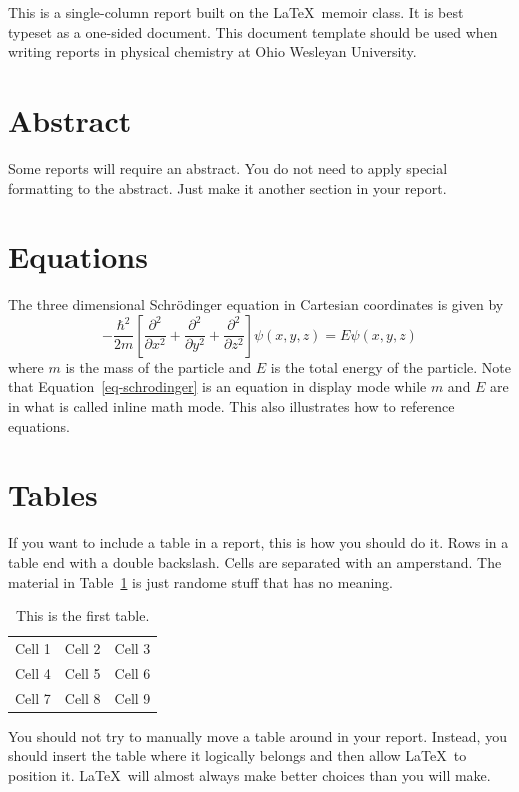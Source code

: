 \documentclass[letterpaper,article,11pt,oneside]{memoir}
\title{\doctitle}
\author{\docauthor}
\date{\docdate}
\begin{document}
\maketitle
\thispagestyle{empty}

\noindent This is a single-column report built on the \LaTeX\ memoir class. It is best typeset as a one-sided document. This document template should be used when writing reports in physical chemistry at Ohio Wesleyan University. 

\section{Abstract}
Some reports will require an abstract. You do not need to apply special formatting to the abstract. Just make it another section in your report. 

\section{Equations}
The three dimensional Schr\"odinger equation in Cartesian coordinates is given by
\begin{equation}\label{eq-schrodinger}
-\frac{\hbar^2}{2m}\left[\frac{\partial^2}{\partial x^2} + \frac{\partial^2}{\partial y^2} + \frac{\partial^2}{\partial z^2}\right]\psi(x,y,z) = E \psi(x,y,z)
\end{equation}
where $m$ is the mass of the particle and $E$ is the total energy of the particle. Note that Equation~\ref{eq-schrodinger} is an equation in display mode while $m$ and $E$ are in what is called inline math mode. This also illustrates how to reference equations. 

\section{Tables}
If you want to include a table in a report, this is how you should do it. Rows in a table end with a double backslash. Cells are separated with an amperstand. The material in Table~\ref{tab-illustration} is just randome stuff that has no meaning. 
\begin{table}[h]
\caption{This is the first table.}
\begin{tabular}{lcr}
\hline\hline
Cell 1 & Cell 2 & Cell 3 \\
Cell 4 & Cell 5 & Cell 6 \\
Cell 7 & Cell 8 & Cell 9 \\
\hline\hline
\end{tabular}
\label{tab-illustration}
\end{table}
You should not try to manually move a table around in your report. Instead, you should insert the table where it logically belongs and then allow \LaTeX\ to position it. \LaTeX\ will almost always make better choices than you will make. 
\end{document}
